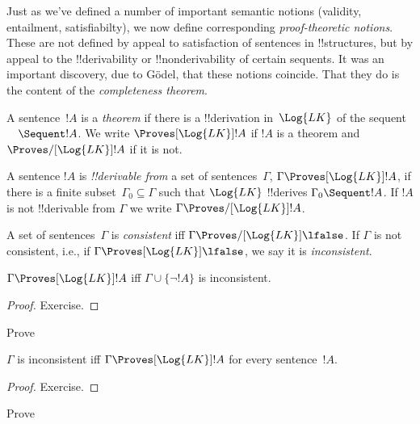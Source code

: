 \documentclass[../../include/open-logic-section]{subfiles}
\begin{document}

\begin{explain}
Just as we've defined a number of important semantic notions
(validity, entailment, satisfiabilty), we now define corresponding
\emph{proof-theoretic notions}. These are not defined by appeal to
satisfaction of sentences in !!{structure}s, but by appeal to the
!!{derivability} or !!{nonderivability} of certain sequents.  It was
an important discovery, due to G\"odel, that these notions coincide.
That they do is the content of the \emph{completeness theorem}.
\end{explain}

\begin{defn}[Theorems]
A sentence~$!A$ is a \emph{theorem} if there is a !!{derivation}
in~$\Log{LK}$ of the sequent $\quad \Sequent !A$. We write
$\Proves[\Log{LK}] !A$ if $!A$ is a theorem and $\Proves/[\Log{LK}]
!A$ if it is not.
\end{defn}

\begin{defn}[Provability]
A sentence $!A$ is \emph{!!{derivable} from} a set of
sentences~$\Gamma$, $\Gamma \Proves[\Log{LK}] !A$, if there is a
finite subset~$\Gamma_0 \subseteq \Gamma$ such that $\Log{LK}$
!!{derive}s $\Gamma_0 \Sequent !A$.  If $!A$ is not !!{derivable} from
$\Gamma$ we write $\Gamma \Proves/[\Log{LK}] !A$.
\end{defn}

\begin{defn}[Consistency]
A set of sentences~$\Gamma$ is \emph{consistent} iff $\Gamma
\Proves/[\Log{LK}] \lfalse$.  If $\Gamma$ is not consistent, i.e., if
$\Gamma \Proves[\Log{LK}] \lfalse$, we say it is \emph{inconsistent}.
\end{defn}

\begin{prop}
$\Gamma \Proves[\Log{LK}] !A$ iff $\Gamma \cup \{\lnot !A\}$ is inconsistent.
\end{prop}

\begin{proof}
Exercise.
\end{proof}

\begin{prob}
Prove 
\end{prob}

\begin{prop}
$\Gamma$ is inconsistent iff $\Gamma \Proves[\Log{LK}] {!A}$ for every
  sentence~$!A$.
\end{prop}

\begin{proof}
Exercise.
\end{proof}

\begin{prob}
Prove 
\end{prob}
\end{document}
